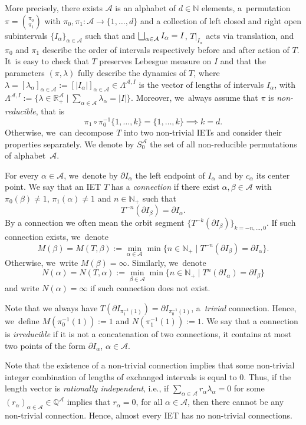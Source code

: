 \documentclass[JEP,XML,SOM,Unicode,NoEqCountersInSection,NoFloatCountersInSection,published]{cedram}
\let\oldbigsqcup\bigsqcup
\renewcommand{\bigsqcup}{\mathop{\textstyle\oldbigsqcup}\displaylimits}
\theoremstyle{plain}
\theoremstyle{definition}
\newcommand{\A}{\mathcal{A}}
\newcommand{\N}{\mathbb{N}}
\newcommand{\R}{\mathbb{R}}
\begin{document}
{More precisely, there exists $\A$ is an alphabet of $d\in\N$ elements, a~permutation $\pi=\binom{\pi_0}{\pi_1}$ with $\pi_0,\pi_1:\mathcal A\to\{1,\ldots,d\}$ and a collection of left closed and right open subintervals $\{I_{\alpha}\}_{\alpha\in\mathcal A}$ such that and $\bigsqcup_{\alpha\in\A} I_{\alpha}=I$, $T|_{I_{\alpha}}$ acts via translation, and $\pi_0$ and $\pi_1$ describe the order of intervals respectively before and after
action of $T$. It~is easy to check that $T$ preserves Lebesgue measure on $I$ and that the parameters $(\pi,\lambda)$ fully describe the dynamics of $T$, where $\lambda=[\lambda_\alpha]_{\alpha\in\A}:=[|I_{\alpha}|]_{\alpha\in\A}\in \Lambda^{\mathcal A,I}$ is the vector of lengths of intervals $I_{\alpha}$, with $\Lambda^{\mathcal A,I}:=\{\lambda\in\R^{\A}_{+}\mid \sum_{\alpha\in\A}\lambda_{\alpha}=|I|\}$. {Moreover, we~always assume that $\pi$ is \emph{non-reducible}, that is
\[
\pi_1\circ\pi^{-1}_0\{1,\ldots,k\}=\{1,\ldots,k\}\implies k=d.
\]
Otherwise, we~can decompose $T$ into two non-trivial IETs and consider their properties separately. We denote by $S_0^{\A}$ the set of all non-reducible permutations of alphabet~$\A$.
}

For every $\alpha\in\A$, we~denote by $\partial I_{\alpha}$ the left endpoint of $I_{\alpha}$ and by $c_{\alpha}$ its center point. We say that an IET $T$ has a \emph{connection} if there exist $\alpha,\beta\in\A$ with $\pi_0(\beta)\neq 1$, $\pi_1(\alpha)\neq 1$ and $n\in\N_+$ such that
\[
T^{-n}(\partial I_\beta)=\partial I_{\alpha}.
\]
By a connection we often mean the orbit segment $\{T^{-k}(\partial I_\beta)\}_{k=-n,\ldots,0}$.
If such connection exists, we~denote
\[
M(\beta)=M(T,\beta):=\min_{\alpha\in\A}\min\{n\in\N_+\mid T^{-n}(\partial I_\beta)=\partial I_{\alpha}\}.
\]
Otherwise, we~write $M(\beta)=\infty$. Similarly, we~denote
\[
N(\alpha)=N(T,\alpha):=\min_{\beta\in\A}\min\{n\in\N_+\mid T^{n}(\partial I_\alpha)=\partial I_{\beta}\}
\]
and write $N(\alpha)=\infty$ if such connection does not exist. {Note that we always have $T(\partial I_{\pi_1^{-1}(1)})=\partial I_{\pi_0^{-1}(1)}$, a~\emph{trivial} connection. Hence, we~define $M(\pi_0^{-1}(1)):=1$ and $N(\pi_1^{-1}(1)):=1$. {We say that a connection is \emph{irreducible} if it is not a concatenation of two connections, \ie it contains at most two points of the form $\partial I_{\alpha}$, $\alpha\in\A$}.

}

Note that the existence of a non-trivial connection implies that some
non-trivial integer combination of lengths of exchanged intervals is equal to
$0$. Thus, if the length vector is \emph{rationally independent}, i.e., if
$\sum_{\alpha\in\A}r_{\alpha}\lambda_\alpha=0$ for some $(r_{\alpha})_{\alpha
\in \A} \in\mathbb Q^{\A}$ implies that $r_{\alpha}=0$, for all $\alpha\in\A$,
then there cannot be any non-trivial connection. Hence, almost every IET has no non-trivial
connections.

}
\end{document}
